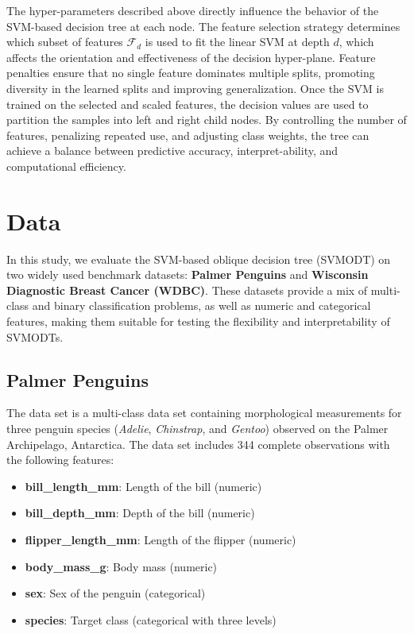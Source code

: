 The hyper-parameters described above directly influence the behavior of the SVM-based decision tree at each node. The feature selection strategy determines which subset of features \(\mathcal{F}_d\) is used to fit the linear SVM at depth \(d\), which affects the orientation and effectiveness of the decision hyper-plane. Feature penalties ensure that no single feature dominates multiple splits, promoting diversity in the learned splits and improving generalization. Once the SVM is trained on the selected and scaled features, the decision values are used to partition the samples into left and right child nodes. By controlling the number of features, penalizing repeated use, and adjusting class weights, the tree can achieve a balance between predictive accuracy, interpret-ability, and computational efficiency.

\section{Data}\label{data}

In this study, we evaluate the SVM-based oblique decision tree (SVMODT) on two widely used benchmark datasets: \textbf{Palmer Penguins} and \textbf{Wisconsin Diagnostic Breast Cancer (WDBC)}. These datasets provide a mix of multi-class and binary classification problems, as well as numeric and categorical features, making them suitable for testing the flexibility and interpretability of SVMODTs.

\subsection{Palmer Penguins}\label{palmer-penguins}

The  data set is a multi-class data set containing morphological measurements for three penguin species (\emph{Adelie}, \emph{Chinstrap}, and \emph{Gentoo}) observed on the Palmer Archipelago, Antarctica. The data set includes 344 complete observations with the following features:

\begin{itemize}
\tightlist
\item
  \textbf{bill\_length\_mm}: Length of the bill (numeric)\\
\item
  \textbf{bill\_depth\_mm}: Depth of the bill (numeric)\\
\item
  \textbf{flipper\_length\_mm}: Length of the flipper (numeric)\\
\item
  \textbf{body\_mass\_g}: Body mass (numeric)\\
\item
  \textbf{sex}: Sex of the penguin (categorical)\\
\item
  \textbf{species}: Target class (categorical with three levels)
\end{itemize}

